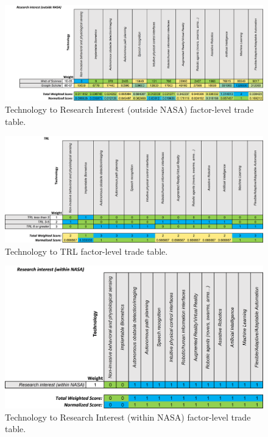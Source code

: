 \begin{figure}[b!]
    \begin{center}
        \includegraphics[width=0.8\linewidth]{figures/TradeStudy/figurea6.png}
        \caption[Technology to Research Interest (outside NASA) factor-level trade table]{Technology to Research Interest (outside NASA) factor-level trade table.}
    \end{center}
\end{figure}

\begin{figure}[b!]
    \begin{center}
        \includegraphics[width=0.8\linewidth]{figures/TradeStudy/figurea7.png}
        \caption[Technology to TRL factor-level trade table]{Technology to TRL factor-level trade table.}
    \end{center}
\end{figure}

\begin{figure}[b!]
    \begin{center}
        \includegraphics[width=0.8\linewidth]{figures/TradeStudy/figurea8.png}
        \caption[Technology to Research Interest (within NASA) factor-level trade table]{Technology to Research Interest (within NASA) factor-level trade table.}
    \end{center}
\end{figure}

